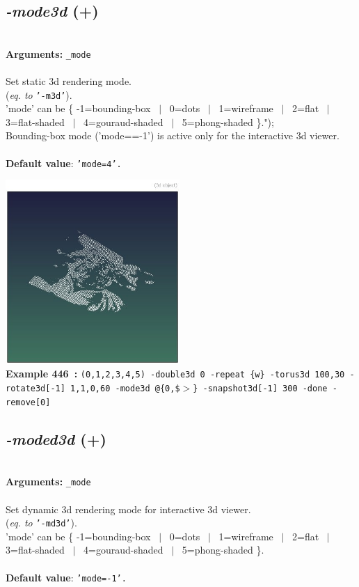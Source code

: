 \documentclass[a4paper,11pt,twoside]{book}
\begin{document}
\subsection{\emph{-mode3d} (+)}\vspace*{-0.5em}
~\\\textbf{Arguments: } 
{\small \texttt{\_mode}}\\~\\
Set static 3d rendering mode.
~\\(\emph{eq. to} {\small \texttt{'-m3d'}}).
~\\'mode' can be \{ -1=bounding-box ~$|$~ 0=dots ~$|$~ 1=wireframe ~$|$~ 2=flat ~$|$~ 3=flat-shaded ~$|$~ 4=gouraud-shaded ~$|$~ 5=phong-shaded \}.");
~\\Bounding-box mode ('mode==-1') is active only for the interactive 3d viewer.
~\\~\\\textbf{Default value}: {\small \texttt{'mode=4'.}}
\begin{center}\includegraphics[keepaspectratio=true,height=7cm,width=\textwidth]{img/gmic_def446.jpg}\\
{\footnotesize \textbf{Example 446~:} \texttt{(0,1,2,3,4,5) -double3d 0 -repeat \{w\} -torus3d 100,30 -rotate3d[-1] 1,1,0,60 -mode3d @\{0,\$$>$\} -snapshot3d[-1] 300 -done -remove[0]}}
\end{center}

\subsection{\emph{-moded3d} (+)}\vspace*{-0.5em}
~\\\textbf{Arguments: } 
{\small \texttt{\_mode}}\\~\\
Set dynamic 3d rendering mode for interactive 3d viewer.
~\\(\emph{eq. to} {\small \texttt{'-md3d'}}).
~\\'mode' can be \{ -1=bounding-box ~$|$~ 0=dots ~$|$~ 1=wireframe ~$|$~ 2=flat ~$|$~ 3=flat-shaded ~$|$~ 4=gouraud-shaded ~$|$~ 5=phong-shaded \}.
~\\~\\\textbf{Default value}: {\small \texttt{'mode=-1'.}}
\end{document}
